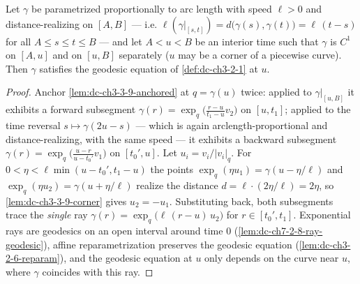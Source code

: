 \begin{lemma}
  \label{lem:dc-ch3-3-9-localization}
  \leanok
  Let $\gamma$ be parametrized proportionally to arc length with speed
  $\ell>0$ and distance-realizing on $[A,B]$ — i.e.
  $\ell(\gamma|_{[s,t]})=d\big(\gamma(s),\gamma(t)\big)=\ell\,(t-s)$ for all
  $A\le s\le t\le B$ — and let $A<u<B$ be an interior time such that
  $\gamma$ is $C^1$ on $[A,u]$ and on $[u,B]$ separately ($u$ may be a corner
  of a piecewise curve). Then $\gamma$ satisfies the geodesic equation of
  \cref{def:dc-ch3-2-1} at $u$.
\end{lemma}
\begin{proof}
  \sketch
  \leanok
  Anchor \cref{lem:dc-ch3-3-9-anchored} at $q=\gamma(u)$ twice: applied to
  $\gamma|_{[u,B]}$ it exhibits a forward subsegment
  $\gamma(r)=\exp_q\big(\tfrac{r-u}{t_1-u}v_2\big)$ on $[u,t_1]$; applied to
  the time reversal $s\mapsto\gamma(2u-s)$ — which is again
  arclength-proportional and distance-realizing, with the same speed — it
  exhibits a backward subsegment
  $\gamma(r)=\exp_q\big(\tfrac{u-r}{u-t_0'}v_1\big)$ on $[t_0',u]$. Let
  $u_i=v_i/|v_i|_q$. For $0<\eta<\ell\min(u-t_0',t_1-u)$ the points
  $\exp_q(\eta u_1)=\gamma(u-\eta/\ell)$ and
  $\exp_q(\eta u_2)=\gamma(u+\eta/\ell)$ realize the distance
  $d=\ell\cdot(2\eta/\ell)=2\eta$, so \cref{lem:dc-ch3-3-9-corner} gives
  $u_2=-u_1$. Substituting back, both subsegments trace the \emph{single}
  ray $\gamma(r)=\exp_q\big(\ell\,(r-u)\,u_2\big)$ for
  $r\in[t_0',t_1]$. Exponential rays are geodesics on an open interval
  around time $0$ (\cref{lem:dc-ch7-2-8-ray-geodesic}), affine
  reparametrization preserves the geodesic equation
  (\cref{lem:dc-ch3-2-6-reparam}), and the geodesic equation at $u$ only
  depends on the curve near $u$, where $\gamma$ coincides with this ray.

\end{proof}

